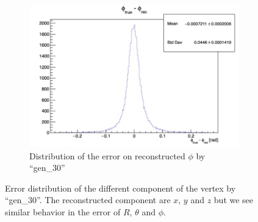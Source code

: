 \documentclass[../main.tex]{subfiles}
\begin{document}
\begin{figure}[ht]
\begin{subfigure}[t]{0.32\linewidth}
    \includegraphics[width=\linewidth]{images/jcnn/vic_cnn/cnn_delta_phi.png}
    \caption{Distribution of the error on reconstructed $\phi$ by ``gen\_30''}
    \label{fig:jcnn:vic_cnn:cnn_delta_phi}
  \end{subfigure}
  \caption{Error distribution of the different component of the vertex by ``gen\_30''. The reconstructed component are $x$, $y$ and $z$ but we see similar behavior in the error of $R$, $\theta$ and $\phi$.}
  \label{fig:jcnn:vic_cnn:cnn_perf}
\end{figure}
\end{document}
